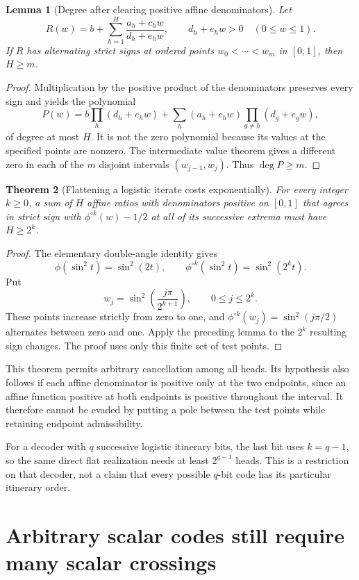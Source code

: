 \documentclass[11pt]{article}
\newtheorem{theorem}{Theorem}
\newtheorem{lemma}[theorem]{Lemma}
\begin{document}
\begin{lemma}[Degree after clearing positive affine denominators]
Let
\[
 R(w)=b+\sum_{h=1}^H\frac{a_h+c_hw}{d_h+e_hw},
 \qquad d_h+e_hw>0\quad(0\le w\le1).
\]
If $R$ has alternating strict signs at ordered points
$w_0<\cdots<w_m$ in $[0,1]$, then $H\ge m$.
\end{lemma}
\begin{proof}
Multiplication by the positive product of the denominators preserves
every sign and yields the polynomial
\[
 P(w)=b\prod_h(d_h+e_hw)
       +\sum_h(a_h+c_hw)\prod_{g\ne h}(d_g+e_gw),
\]
of degree at most $H$. It is not the zero polynomial because its
values at the specified points are nonzero. The intermediate value
theorem gives a different zero in each of the $m$ disjoint intervals
$(w_{j-1},w_j)$. Thus $\deg P\ge m$.
\end{proof}

\begin{theorem}[Flattening a logistic iterate costs exponentially]
For every integer $k\ge0$, a sum of $H$ affine ratios with
denominators positive on $[0,1]$ that agrees in strict sign with
$\phi^{\circ k}(w)-1/2$ at all of its successive extrema must have
$H\ge2^k$.
\end{theorem}
\begin{proof}
The elementary double-angle identity gives
\[
 \phi(\sin^2t)=\sin^2(2t),\qquad
 \phi^{\circ k}(\sin^2t)=\sin^2(2^kt).
\]
Put
\[
 w_j=\sin^2\left(\frac{j\pi}{2^{k+1}}\right),
             \qquad 0\le j\le2^k.
\]
These points increase strictly from zero to one, and
$\phi^{\circ k}(w_j)=\sin^2(j\pi/2)$ alternates between zero
and one. Apply the preceding lemma to the $2^k$ resulting sign
changes. The proof uses only this finite set of test points.
\end{proof}

This theorem permits arbitrary cancellation among all heads. Its
hypothesis also follows if each affine denominator is positive only
at the two endpoints, since an affine function positive at both
endpoints is positive throughout the interval. It therefore cannot
be evaded by putting a pole between the test points while retaining
endpoint admissibility.

For a decoder with $q$ successive logistic itinerary bits, the last
bit uses $k=q-1$, so the same direct flat realization needs at least
$2^{q-1}$ heads. This is a restriction on that decoder, not a claim
that every possible $q$-bit code has its particular itinerary order.

\section{Arbitrary scalar codes still require many scalar crossings}
\end{document}
